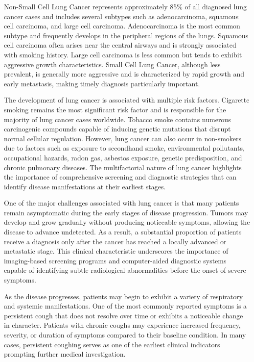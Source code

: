Non-Small Cell Lung Cancer represents approximately 85\% of all diagnosed lung cancer cases and includes several subtypes such as adenocarcinoma, squamous cell carcinoma, and large cell carcinoma. Adenocarcinoma is the most common subtype and frequently develops in the peripheral regions of the lungs. Squamous cell carcinoma often arises near the central airways and is strongly associated with smoking history. Large cell carcinoma is less common but tends to exhibit aggressive growth characteristics. Small Cell Lung Cancer, although less prevalent, is generally more aggressive and is characterized by rapid growth and early metastasis, making timely diagnosis particularly important.

The development of lung cancer is associated with multiple risk factors. Cigarette smoking remains the most significant risk factor and is responsible for the majority of lung cancer cases worldwide. Tobacco smoke contains numerous carcinogenic compounds capable of inducing genetic mutations that disrupt normal cellular regulation. However, lung cancer can also occur in non-smokers due to factors such as exposure to secondhand smoke, environmental pollutants, occupational hazards, radon gas, asbestos exposure, genetic predisposition, and chronic pulmonary diseases. The multifactorial nature of lung cancer highlights the importance of comprehensive screening and diagnostic strategies that can identify disease manifestations at their earliest stages.

One of the major challenges associated with lung cancer is that many patients remain asymptomatic during the early stages of disease progression. Tumors may develop and grow gradually without producing noticeable symptoms, allowing the disease to advance undetected. As a result, a substantial proportion of patients receive a diagnosis only after the cancer has reached a locally advanced or metastatic stage. This clinical characteristic underscores the importance of imaging-based screening programs and computer-aided diagnostic systems capable of identifying subtle radiological abnormalities before the onset of severe symptoms.

As the disease progresses, patients may begin to exhibit a variety of respiratory and systemic manifestations. One of the most commonly reported symptoms is a persistent cough that does not resolve over time or exhibits a noticeable change in character. Patients with chronic coughs may experience increased frequency, severity, or duration of symptoms compared to their baseline condition. In many cases, persistent coughing serves as one of the earliest clinical indicators prompting further medical investigation.

